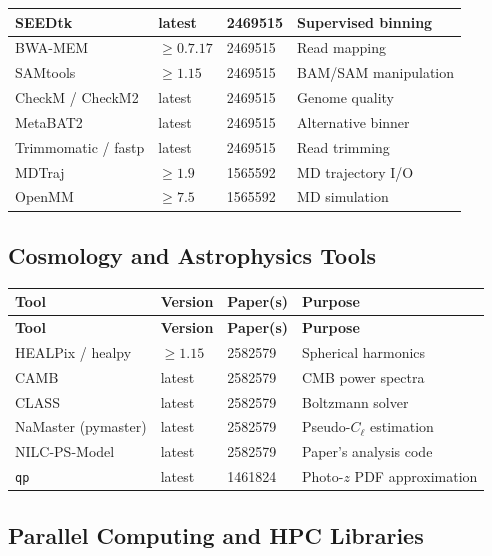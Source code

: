 \documentclass[11pt,a4paper]{article}
\begin{document}
\begin{longtable}{p{3.5cm} p{2cm} p{3cm} p{5cm}}
\midrule
SEEDtk & latest & 2469515 & Supervised binning \\
\midrule
BWA-MEM & $\geq 0.7.17$ & 2469515 & Read mapping \\
\midrule
SAMtools & $\geq 1.15$ & 2469515 & BAM/SAM manipulation \\
\midrule
CheckM / CheckM2 & latest & 2469515 & Genome quality \\
\midrule
MetaBAT2 & latest & 2469515 & Alternative binner \\
\midrule
Trimmomatic / fastp & latest & 2469515 & Read trimming \\
\midrule
MDTraj & $\geq 1.9$ & 1565592 & MD trajectory I/O \\
\midrule
OpenMM & $\geq 7.5$ & 1565592 & MD simulation \\
\bottomrule
\end{longtable}


\subsection{Cosmology and Astrophysics Tools}

\begin{longtable}{p{3.5cm} p{2cm} p{3cm} p{5cm}}
\toprule
\textbf{Tool} & \textbf{Version} & \textbf{Paper(s)} & \textbf{Purpose} \\
\midrule
\endfirsthead
\toprule
\textbf{Tool} & \textbf{Version} & \textbf{Paper(s)} & \textbf{Purpose} \\
\midrule
\endhead
HEALPix / healpy & $\geq 1.15$ & 2582579 & Spherical harmonics \\
\midrule
CAMB & latest & 2582579 & CMB power spectra \\
\midrule
CLASS & latest & 2582579 & Boltzmann solver \\
\midrule
NaMaster (pymaster) & latest & 2582579 & Pseudo-$C_\ell$ estimation \\
\midrule
NILC-PS-Model & latest & 2582579 & Paper's analysis code \\
\midrule
\texttt{qp} & latest & 1461824 & Photo-$z$ PDF approximation \\
\bottomrule
\end{longtable}


\subsection{Parallel Computing and HPC Libraries}
\end{document}
